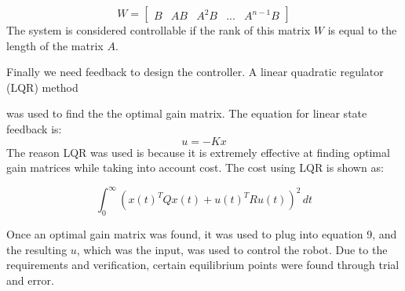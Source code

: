 \documentclass[10pt, letterbox]{article}
\begin{document}
\begin{equation}
W = 
\begin{bmatrix}
B & AB & A^2B & ... & A^{n-1}B
\end{bmatrix}
\end{equation}
The system is considered controllable if the rank of this matrix $W$ is equal to the length of the matrix $A$.\\
\begin{addmargin}[5em]{0em}
Finally we need feedback to design the controller. A linear quadratic regulator (LQR) method \end{addmargin} was used to find the the optimal gain matrix. The equation for linear state feedback is:
\begin{equation}
u = -Kx
\end{equation}
The reason LQR was used is because it is extremely effective at finding optimal gain matrices while taking into account cost. The cost using LQR is shown as:
\begin{center}
\begin{equation}
\int_{0}^{\infty} (x(t)^TQx(t)+u(t)^TRu(t))^2 \,dt
\end{equation}
\end{center}
Once an optimal gain matrix was found, it was used to plug into equation 9, and the resulting $u$, which was the input, was used to control the robot. Due to the requirements and verification, certain equilibrium points were found through trial and error. 
\end{document}

